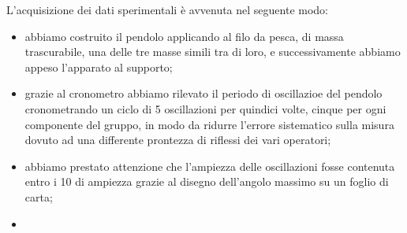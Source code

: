 L'acquisizione dei dati sperimentali è avvenuta nel seguente modo:
\begin{itemize}
	\item{abbiamo costruito il pendolo applicando al filo da pesca, di massa trascurabile, una delle tre masse simili tra di loro, e successivamente abbiamo appeso l'apparato al supporto;}
	\item{grazie al cronometro abbiamo rilevato il periodo di oscillazioe del pendolo cronometrando un ciclo di 5 oscillazioni per quindici volte, cinque per ogni componente del gruppo, in modo da ridurre l'errore sistematico sulla misura dovuto ad una differente prontezza di riflessi dei vari operatori;}
	\item{abbiamo prestato attenzione che l'ampiezza delle oscillazioni fosse contenuta entro i 10 di ampiezza grazie al disegno dell'angolo massimo su un foglio di carta;}
	\item{}
\end{itemize}

